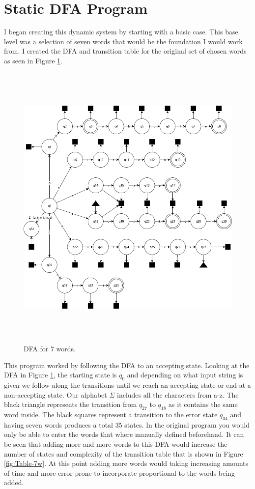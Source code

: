 \documentclass[letter, 12pt]{article}
\begin{document}
\section*{Static DFA Program}
I began creating this dynamic system by starting with a basic case. This base level was a selection of seven words that would be the foundation I would work from. I created the DFA and transition table for the original set of chosen words as seen in Figure \ref{fig:DFA-7w}.
\clearpage
\begin{figure}[!htb]
  \includegraphics[width=17cm, height=14.5cm, keepaspectratio,]{DFA-Diagram}
  \caption{DFA for 7 words.}
  \label{fig:DFA-7w}
\end{figure} 
This program worked by following the DFA to an accepting state. Looking at the DFA in Figure \ref{fig:DFA-7w}, the starting state is $q_0$ and depending on what input string is given we follow along the transitions until we reach an accepting state or end at a non-accepting state. Our alphabet $\Sigma$ includes all the characters from a-z. The black triangle represents the transition from $q_{27}$ to $q_{18}$ as it contains the same word inside. The black squares represent a transition to the error state $q_{34}$ and having seven words produces a total 35 states. In the original program you would only be able to enter the words that where manually defined beforehand. It can be seen that adding more and more words to this DFA would increase the number of states and complexity of the transition table that is shown in Figure \ref{fig:Table-7w}. At this point adding more words would taking increasing amounts of time and more error prone to incorporate proportional to the words being added.
\end{document}
